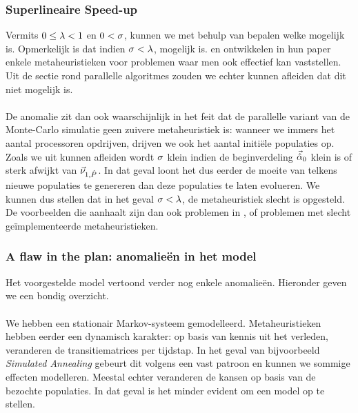 \subsubsection{Superlineaire Speed-up}

Vermits $0\leq\metapb<1$ en $0<\metapa$, kunnen we met behulp van  bepalen welke \absu{} mogelijk is. Opmerkelijk is dat indien $\metapa<\metapb$, \abslsu{} mogelijk is.  en  ontwikkelen in hun paper\cite{DBLP:journals/jc/ShonkwilerV94} enkele metaheuristieken voor problemen waar men ook effectief \abslsu{} kan vaststellen. Uit de sectie rond parallelle algoritmes zouden we echter kunnen afleiden dat dit niet mogelijk is.

\paragraph{}
De anomalie zit dan ook waarschijnlijk in het feit dat de parallelle variant van de Monte-Carlo simulatie geen zuivere metaheuristiek is: wanneer we immers het aantal processoren opdrijven, drijven we ook het aantal initi\"ele populaties op. Zoals we uit  kunnen afleiden wordt $\metapa$ klein indien de beginverdeling $\probdistnormmeta{0}$ klein is of sterk afwijkt van $\evr[1,\removmat]$. In dat geval loont het dus eerder de moeite van telkens nieuwe populaties te genereren dan deze populaties te laten evolueren. We kunnen dus stellen dat in het geval $\metapa<\metapb$, de metaheuristiek slecht is opgesteld. De voorbeelden die \cite{DBLP:journals/jc/ShonkwilerV94} aanhaalt zijn dan ook problemen in , of problemen met slecht ge\"implementeerde metaheuristieken.

\subsubsection{A flaw in the plan: anomalie\"en in het model}

Het voorgestelde model vertoond verder nog enkele anomalie\"en. Hieronder geven we een bondig overzicht.

\paragraph{}
We hebben een stationair Markov-systeem gemodelleerd. Metaheuristieken hebben eerder een dynamisch karakter: op basis van kennis uit het verleden, veranderen de transitiematrices per tijdstap. In het geval van bijvoorbeeld \emph{Simulated Annealing} gebeurt dit volgens een vast patroon en kunnen we sommige effecten modelleren\cite{}. Meestal echter veranderen de kansen op basis van de bezochte populaties. In dat geval is het minder evident om een model op te stellen.


